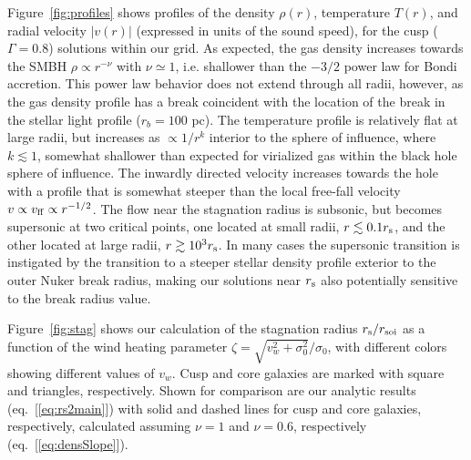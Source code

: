 \documentclass[usenatbib,fleqn]{mn2e}
\newcommand{\rb}{r_b}
\newcommand{\densSlope}{\nu}
\begin{document}
Figure~\ref{fig:profiles} shows profiles of the density $\rho(r)$,
temperature $T(r)$, and radial velocity $|v(r)|$ (expressed in units of the sound speed), for the cusp
($\Gamma=0.8$) solutions within our grid.  As expected, the gas
density increases towards the SMBH $\rho\propto r^{-\densSlope}$ with
$\densSlope\simeq1$, i.e. shallower than the $-3/2$ power law for
Bondi accretion. This power law behavior does not extend
through all radii, however, as the gas density profile has a break coincident
with the location of the break in the stellar light profile ($\rb=100$
pc). The temperature profile is relatively flat at large radii, but
increases as $\propto 1/r^{k}$ interior to the sphere of influence,
where $k\lesssim 1$, somewhat shallower than expected for virialized gas within the black hole sphere of influence.
The inwardly directed velocity increases towards the hole with a profile that is somewhat steeper than the local free-fall velocity $v \propto v_{\rm ff}\propto r^{-1/2}$.  The flow near the stagnation radius is subsonic, but becomes supersonic at two critical points, one located at small radii, $r \lesssim 0.1r_{\rm s}$, and the other located at large radii, $r \gtrsim 10^{3}r_{\rm s}$.  In many cases the supersonic transition is instigated by the transition to a steeper stellar density profile exterior to the outer Nuker break radius, making our solutions near $r_{\rm s}$ also potentially sensitive to the break radius value.

Figure~\ref{fig:stag} shows our calculation of the stagnation radius $r_{\rm s}/r_{\rm
  soi}$ as a function of the wind heating parameter $\zeta = \sqrt{v_w^{2}+\sigma_0^{2}}/\sigma_0$, with different colors showing different values of $v_{w}$.  Cusp and core galaxies are marked with square and triangles,
respectively.  Shown for comparison are our analytic results
(eq.~[\ref{eq:rs2main}]) with solid and dashed lines for cusp and core
galaxies, respectively, calculated assuming $\densSlope = 1$ and
$\densSlope= 0.6$, respectively (eq.~[\ref{eq:densSlope}]).  
\end{document}

